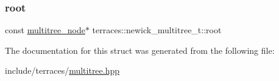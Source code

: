 \subsubsection{\texorpdfstring{root}{root}}
{\footnotesize\ttfamily const \hyperlink{structterraces_1_1multitree__node}{multitree\+\_\+node}$\ast$ terraces\+::newick\+\_\+multitree\+\_\+t\+::root}



The documentation for this struct was generated from the following file\+:\begin{DoxyCompactItemize}
\item 
include/terraces/\hyperlink{multitree_8hpp}{multitree.\+hpp}\end{DoxyCompactItemize}

